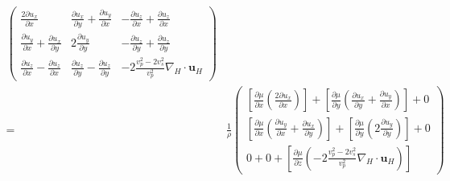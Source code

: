 \documentclass{article} %
\providecommand{\DIFaddbegin}{} %
\providecommand{\DIFaddend}{} %
\providecommand{\DIFdelbegin}{} %
\providecommand{\DIFdelend}{} %
\newcommand{\DIFscaledelfig}{0.5}
\newlength{\DIFdelgraphicswidth} %
\newlength{\DIFdelgraphicsheight} %
\newcommand{\DIFaddincludegraphics}[2][]{{\color{blue}\fbox{\DIFOincludegraphics[#1]{#2}}}} %
\newcommand{\DIFdelincludegraphics}[2][]{%
\sbox{\DIFdelgraphicsbox}{\DIFOincludegraphics[#1]{#2}}%
\settoboxwidth{\DIFdelgraphicswidth}{\DIFdelgraphicsbox} %
\settoboxtotalheight{\DIFdelgraphicsheight}{\DIFdelgraphicsbox} %
\scalebox{\DIFscaledelfig}{%
\parbox[b]{\DIFdelgraphicswidth}{\usebox{\DIFdelgraphicsbox}\\[-\baselineskip] \rule{\DIFdelgraphicswidth}{0em}}\llap{\resizebox{\DIFdelgraphicswidth}{\DIFdelgraphicsheight}{%
\setlength{\unitlength}{\DIFdelgraphicswidth}%
\begin{picture}(1,1)%
\thicklines\linethickness{2pt} %
{\color[rgb]{1,0,0}\put(0,0){\framebox(1,1){}}}%
{\color[rgb]{1,0,0}\put(0,0){\line( 1,1){1}}}%
{\color[rgb]{1,0,0}\put(0,1){\line(1,-1){1}}}%
\end{picture}%
}\hspace*{3pt}}} %
} %
\DeclareRobustCommand{\DIFaddbegin}{\DIFOaddbegin \let\includegraphics\DIFaddincludegraphics} %
\DeclareRobustCommand{\DIFaddend}{\DIFOaddend \let\includegraphics\DIFOincludegraphics} %
\DeclareRobustCommand{\DIFdelbegin}{\DIFOdelbegin \let\includegraphics\DIFdelincludegraphics} %
\DeclareRobustCommand{\DIFdelend}{\DIFOaddend \let\includegraphics\DIFOincludegraphics} %
\begin{document}
\begin{itemize}
\begin{align}
\DIFdelend \DIFaddbegin \begin{pmatrix}
				\frac{2\partial u_{x}}{\partial x} & \frac{\partial u_{x}}{\partial y}  + \frac{\partial u_{y}}{\partial x}& -\frac{\partial u_{z}}{\partial x} + \frac{\partial u_{z}}{\partial x}\\
				\frac{\partial u_{y}}{\partial x} + \frac{\partial u_{x}}{\partial y}& 2\frac{\partial u_{y}}{\partial y} & -\frac{\partial u_{z}}{\partial y} + \frac{\partial u_{z}}{\partial y}\\
				\frac{\partial u_{z}}{\partial x} - \frac{\partial u_{z}}{\partial x}& \frac{\partial u_{z}}{\partial y} - \frac{\partial u_{z}}{\partial y}& - 2\frac{v_{p}^{2} - 2v_{s}^{2}}{v_{p}^{2}} \nabla_{H} \cdot \bm{u}_{H}
			\end{pmatrix}\DIFaddend \\
			= \: 
			&\frac{1}{\rho} 
			\DIFdelbegin %
\DIFdelend \DIFaddbegin \begin{pmatrix}
				[\frac{\partial \mu}{\partial x}(\frac{2\partial u_{x}}{\partial x})] + [\frac{\partial \mu}{\partial y} (\frac{\partial u_{x}}{\partial y}  + \frac{\partial u_{y}}{\partial x})]+ 0\\
				[\frac{\partial \mu}{\partial x}(\frac{\partial u_{y}}{\partial x} + \frac{\partial u_{x}}{\partial y})]+ [\frac{\partial \mu}{\partial y}(2\frac{\partial u_{y}}{\partial y}) ]+ 0\\
				0 + 0 + [\frac{\partial \mu}{\partial z}(- 2\frac{v_{p}^{2} - 2v_{s}^{2}}{v_{p}^{2}} \nabla_{H} \cdot \bm{u}_{H})]
			\end{pmatrix}\DIFaddend 
		\end{align}
	\end{itemize}
\end{document}
